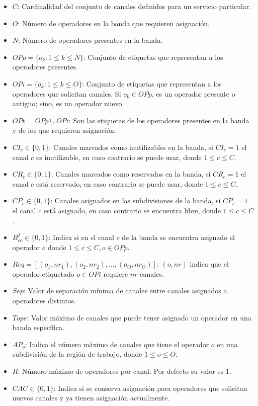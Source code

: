 \begin{itemize}
	\item $C$: Cardinalidad del conjunto de canales definidos para un servicio particular.
	\item $O$: Número de operadores en la banda que requieren asignación.
	\item $N$: Número de operadores presentes en la banda.
	\item $OPp = \{o_k: 1 \leq k \leq N\}$: Conjunto de etiquetas que representan a los operadores presentes.
	\item $OPi = \{o_k: 1 \leq k \leq O\}$: Conjunto de etiquetas que representan a los operadores que solicitan canales. Si $o_k \in OPp$, es un operador presente o antiguo; sino, es un operador nuevo.
	\item $OPt$ = $OPp \cup OPi$: Son las etiquetas de los operadores presentes en la banda y de los que requieren asignación.
	\item $CI_{c} \in \{0,1\}$: Canales marcados como inutilizables en la banda, si $CI_{c} = 1$ el canal $c$ es inutilizable, en caso contrario se puede usar, donde  $1 \leq c \leq C$.
	\item $CR_{c} \in \{0,1\}$: Canales marcados como reservados en la banda,  si $CR_{c} = 1$ el canal $c$ está reservado, en caso contrario se puede usar, donde  $1 \leq c \leq C$.
	\item $CP_{c} \in \{0,1\}$: Canales asignados en las subdivisiones de la banda,  si $CP_{c} = 1$ el canal $c$ está asignado, en caso contrario se encuentra libre, donde  $1 \leq c \leq C$.
	\item $B^{I}_{co} \in \{0,1\}$: Indica si en el canal $c$ de la banda se encuentra asignado el operador $o$ donde $1 \leq c \leq C, o \in OPp$.
	\item $Req=[(o_{1}, nr_{1}), (o_{2}, nr_{2}), ... ,(o_{O}, nr_{O})]$: $(o, nr)$ indica que el operador etiquetado $o \in OPi$ requiere $nr$ canales.
	\item $Sep$: Valor de separación mínima de canales entre canales asignados a operadores distintos.
	\item $Tope$: Valor máximo de canales que puede tener asignado un operador en una banda específica.
	\item $AP_{o}$: Indica el número máximo de canales que tiene el operador $o$ en una subdivisión de la región de trabajo, donde $1 \leq o \leq O$.
	\item $R$: Número máximo de operadores por canal. Por defecto su valor es 1.
	\item $CAC \in \{0,1\}$: Indica si se conserva asignación para operadores que solicitan nuevos canales y ya tienen asignación actualmente.
\end{itemize}


